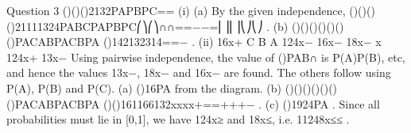 Question 3
()()()2132PAPBPC==
(i) (a) By the given independence, ()()()()21111324PABCPAPBPC⎛⎞⎛⎞∩∩==−−=⎜⎟⎜⎟⎝⎠⎝⎠ .
(b) ()()()()()()()PACABPACBPA ()142132314==− .
(ii) 16x+
C
B
A 124x− 16x− 18x−
x 124x+ 13x−
Using pairwise independence, the value of ()PAB∩ is P(A)P(B), etc, and hence the values 13x−, 18x− and 16x− are found. The others follow using P(A), P(B) and P(C).
(a) ()16PA from the diagram.
(b) ()()()()()()()PACABPACBPA ()()161166132xxxx+==+++− .
(c) ()1924PA .
Since all probabilities must lie in [0,1], we have 124x≥ and 18x≤, i.e. 11248x≤≤ .
